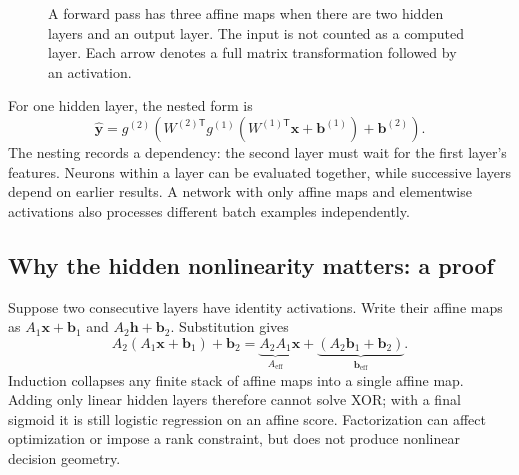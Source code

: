 \begin{figure}[htbp]
\centering
{}
\caption{A forward pass has three affine maps when there are two hidden layers and an output layer. The input is not counted as a computed layer. Each arrow denotes a full matrix transformation followed by an activation.}
\end{figure}

For one hidden layer, the nested form is
\[
 \hat{\mathbf{y}}=g^{(2)}\!\left(W^{(2)\mathsf T}
 g^{(1)}(W^{(1)\mathsf T}\mathbf{x}+\mathbf{b}^{(1)})+\mathbf{b}^{(2)}\right).
\]
The nesting records a dependency: the second layer must wait for the first layer's features. Neurons within a layer can be evaluated together, while successive layers depend on earlier results. A network with only affine maps and elementwise activations also processes different batch examples independently.

\subsection{Why the hidden nonlinearity matters: a proof}
Suppose two consecutive layers have identity activations. Write their affine maps as $A_1\mathbf{x}+\mathbf{b}_1$ and $A_2\mathbf{h}+\mathbf{b}_2$. Substitution gives
\[
 A_2(A_1\mathbf{x}+\mathbf{b}_1)+\mathbf{b}_2
 =\underbrace{A_2A_1}_{A_{\mathrm{eff}}}\mathbf{x}
  +\underbrace{(A_2\mathbf{b}_1+\mathbf{b}_2)}_{\mathbf{b}_{\mathrm{eff}}}.
\]
Induction collapses any finite stack of affine maps into a single affine map. Adding only linear hidden layers therefore cannot solve XOR; with a final sigmoid it is still logistic regression on an affine score. Factorization can affect optimization or impose a rank constraint, but does not produce nonlinear decision geometry.

